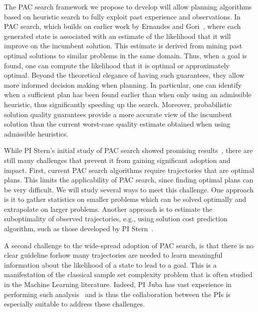 \documentclass[12pt]{article}
\begin{document}
The PAC search framework we propose to develop will allow planning algorithms based on heuristic search to fully exploit past experience and observations. In PAC search, which builds on earlier work by Ernandes and Gori~\cite{ernandes2004likely}, where each generated state is associated with an estimate of the likelihood that it will improve on the incumbent solution. This estimate is derived from mining past optimal solutions to similar problems in the same domain. Thus, when a goal is found, one can compute the likelihood that it is optimal or approximately optimal. Beyond the theoretical elegance of having such guarantees, they allow more informed decision making when planning. In particular, one can identify when a sufficient plan has been found earlier than when only using an admissible heuristic, thus significantly speeding up the search. Moreover, probabilistic solution quality guarantees 
provide a more accurate view of the incumbent solution than the current worst-case quality estimate obtained when using admissible heuristics.  



While PI Stern's initial study of PAC search showed promising results~\cite{stern2011probably,stern2012search}, there are still many challenges that prevent it from gaining significant adoption and impact. First, current PAC search algorithms require trajectories that are optimal plans. This limits the applicability of PAC search, since finding optimal plans can be very difficult. We will study several ways to meet this challenge. One approach is it to gather statistics on smaller problems which can be solved optimally and extrapolate on larger problems. Another approach is to estimate the suboptimality of observed trajectories, e.g., using solution cost prediction algorithm, such as those developed by PI Stern~\cite{}. 



A second challenge to the wide-spread adoption of PAC search, is that there is no clear guideline forhow many trajectories are needed to learn meaningful information about the likelihood of a state to lead to a goal. This is a manifestation of the classical sample set complexity problem that is often studied in the Machine Learning literature. Indeed, PI Juba has vast experience in performing such analysis~\cite{BrendanCanYouPutHereSomeOfYourWork} and is thus the collaboration between the PIs is especially suitable to address these challenges. 
\end{document}
